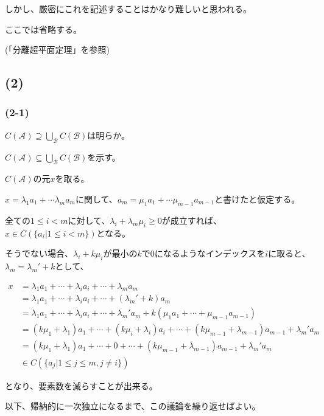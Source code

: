 \documentclass[a4paper, 10pt, dvipdfmx]{jlreq}
\begin{document}
しかし、厳密にこれを記述することはかなり難しいと思われる。

ここでは省略する。

(「分離超平面定理」を参照)

\subsection*{(2)}

\subsubsection*{(2-1)}

$C(\mathcal{A}) \supseteq \bigcup_{\mathcal{B}}C(\mathcal{B})$は明らか。

$C(\mathcal{A}) \subseteq \bigcup_{\mathcal{B}}C(\mathcal{B})$を示す。

$C(\mathcal{A})$の元$x$を取る。

$x=\lambda_1 a_1+ \cdots \lambda_m a_m$に関して、$a_m=\mu_1 a_1 + \cdots \mu_{m-1} a_{m-1}$と書けたと仮定する。

全ての$1 \leq i < m$に対して、$\lambda_i+\lambda_m \mu_i \geq 0$が成立すれば、$x \in C(\{a_i | 1 \leq i < m \})$となる。

そうでない場合、$\lambda_i+k \mu_i$が最小の$k$で0になるようなインデックスを$i$に取ると、$\lambda_m=\lambda_m'+k$として、

\begin{align*}
    x & =\lambda_1 a_1 + \cdots + \lambda_i a_i + \cdots + \lambda_m a_m                                                       \\
      & =\lambda_1 a_1 + \cdots + \lambda_i a_i + \cdots +(\lambda_m'+k) a_m                                                   \\
      & =\lambda_1 a_1 + \cdots + \lambda_i a_i + \cdots + \lambda_m' a_m + k(\mu_1a_1+\cdots+\mu_{m-1}a_{m-1})                \\
      & =(k\mu_1+\lambda_1) a_1 + \cdots + (k\mu_i+\lambda_i)a_i + \cdots + (k \mu_{m-1}+\lambda_{m-1}) a_{m-1}+\lambda_m' a_m \\
      & =(k\mu_1+\lambda_1) a_1 + \cdots + 0 + \cdots + (k \mu_{m-1}+\lambda_{m-1}) a_{m-1}+\lambda_m' a_m                     \\
      & \in C(\{a_j | 1 \leq j \leq m, j\neq i \})
\end{align*}

となり、要素数を減らすことが出来る。

以下、帰納的に一次独立になるまで、この議論を繰り返せばよい。
\end{document}
